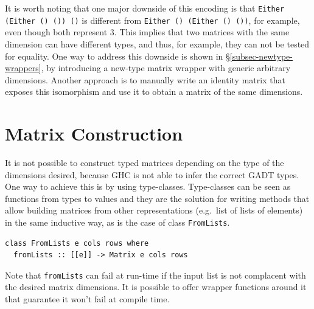 \documentclass[sigplan,screen]{acmart}
\newcommand{\hs}{\texttt}
\def\doc{paper}
\begin{document}
It is worth noting that one major downside of this encoding is that \hs{Either (Either () ()) ()} is different from \hs{Either () (Either () ())}, for example, even though both represent $3$. This implies that two matrices with the same dimension can have different types, and thus, for example, they can not be tested for equality. One way to address this downside is shown in \S\ref{subsec-newtype-wrappers}, by introducing a new-type matrix wrapper with generic arbitrary dimensions. Another approach is to manually write an identity matrix that exposes this isomorphism and use it to obtain a matrix of the same dimensions.  

\section{Matrix Construction}\label{l-m-s}

It is not possible to construct typed matrices depending on the type of the dimensions desired, because GHC is not able to infer the correct GADT types. One way to achieve this is by using type-classes. Type-classes can be seen as functions from types to values and they are the solution for writing methods that allow building matrices from other representations (e.g.\ list of lists of elements) in the same inductive way, as is the case of class \hs{FromLists}.
\begin{verbatim}
class FromLists e cols rows where
  fromLists :: [[e]] -> Matrix e cols rows
\end{verbatim}
\noindent %
Note that \hs{fromLists} can fail at run-time if the input list is not complacent with the desired matrix dimensions. It is possible to offer wrapper functions around it that guarantee it won't fail at compile time.
\end{document}
